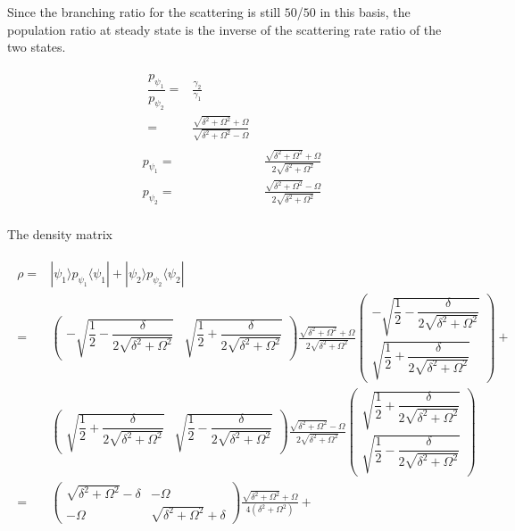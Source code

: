 \documentclass[10pt,fleqn]{article}
\newcommand{\eqar}[1]
{
  \begin{align}
    #1
  \end{align}
}
\newcommand{\paren}[1]{{\left({#1}\right)}}
\begin{document}
Since the branching ratio for the scattering is still $50$/$50$ in this basis,
the population ratio at steady state is the inverse of the scattering rate ratio
of the two states.
\eqar{
  \begin{split}
    \dfrac{p_{\psi_1}}{p_{\psi_2}}=&\frac{\gamma_2}{\gamma_1}\\
    =&\frac{\sqrt{\delta^2+\Omega^2}+\Omega}{\sqrt{\delta^2+\Omega^2}-\Omega}
  \end{split}\\
  p_{\psi_1}=&\frac{\sqrt{\delta^2+\Omega^2}+\Omega}{2\sqrt{\delta^2+\Omega^2}}\\
  p_{\psi_2}=&\frac{\sqrt{\delta^2+\Omega^2}-\Omega}{2\sqrt{\delta^2+\Omega^2}}\\
}
The density matrix
\eqar{
  \begin{split}
    \rho=&|\psi_1\rangle p_{\psi_1}\langle\psi_1|+|\psi_2\rangle p_{\psi_2}\langle\psi_2|\\
    =&\begin{pmatrix}
        -\sqrt{\dfrac12-\dfrac{\delta}{2\sqrt{\delta^2+\Omega^2}}}&\sqrt{\dfrac12+\dfrac{\delta}{2\sqrt{\delta^2+\Omega^2}}}
      \end{pmatrix}
       \frac{\sqrt{\delta^2+\Omega^2}+\Omega}{2\sqrt{\delta^2+\Omega^2}}
       \begin{pmatrix}
         -\sqrt{\dfrac12-\dfrac{\delta}{2\sqrt{\delta^2+\Omega^2}}}\\
         \sqrt{\dfrac12+\dfrac{\delta}{2\sqrt{\delta^2+\Omega^2}}}
       \end{pmatrix}+\\
         &\begin{pmatrix}
            \sqrt{\dfrac12+\dfrac{\delta}{2\sqrt{\delta^2+\Omega^2}}}&\sqrt{\dfrac12-\dfrac{\delta}{2\sqrt{\delta^2+\Omega^2}}}
          \end{pmatrix}
           \frac{\sqrt{\delta^2+\Omega^2}-\Omega}{2\sqrt{\delta^2+\Omega^2}}
           \begin{pmatrix}
             \sqrt{\dfrac12+\dfrac{\delta}{2\sqrt{\delta^2+\Omega^2}}}\\
             \sqrt{\dfrac12-\dfrac{\delta}{2\sqrt{\delta^2+\Omega^2}}}
           \end{pmatrix}\\
    =&\begin{pmatrix}
        \sqrt{\delta^2+\Omega^2}-\delta&-\Omega\\
        -\Omega&\sqrt{\delta^2+\Omega^2}+\delta
      \end{pmatrix}
       \frac{\sqrt{\delta^2+\Omega^2}+\Omega}{4\paren{\delta^2+\Omega^2}}+\\

\end{split}}
\end{document}
